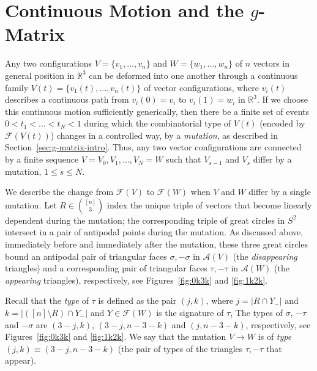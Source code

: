 \documentclass[a4paper,USenglish,cleveref, autoref, thm-restate,nolineno]{socg-lipics-v2021}
\renewcommand{\leq}{\leqslant}
\newcommand{\R}{\mathbb{R}}
\begin{document}
\section{Continuous Motion and the $g$-Matrix}
\label{sec:g-matrix}

Any two configurations $V=\{v_1,\dots,v_n\}$ and $W=\{w_1,\dots,w_n\}$ of $n$ vectors in general position in $\R^3$ can be deformed into one another through a continuous family $V(t)=\{v_1(t),\dots,v_n(t)\}$ of vector configurations, where $v_i(t)$ describes a continuous path from $v_i(0)=v_i$ to $v_i(1)=w_i$ in $\R^3$. If we choose this continuous motion sufficiently generically, then there be a finite set of events $0 < t_1 < \dots < t_N < 1$
during which the combinatorial type of $V(t)$ (encoded by $\mathcal{F}(V(t))$) changes in a controlled way, by a \emph{mutation}, as described in Section~\ref{sec:g-matrix-intro}. Thus, any two vector configurations are connected by a finite sequence $V=V_0,V_1,\dots,V_N=W$ such that $V_{s-1}$ and $V_s$ differ by a mutation, $1\leq s\leq N$. 

We describe the change from $\mathcal{F}(V)$ to $\mathcal{F}(W)$ when $V$ and $W$ differ by a single mutation. 
Let $R \in \binom{[n]}{3}$ index the unique triple of vectors that become linearly dependent during the mutation; the corresponding triple of great circles in $S^2$ intersect in a pair of antipodal points during the mutation. As discussed above, immediately before and immediately after the mutation, these three great circles bound an antipodal pair of triangular faces $\sigma,-\sigma$ in $\mathcal{A}(V)$ 
(the \emph{disappearing} triangles) and a corresponding pair of triangular faces $\tau,-\tau$ in $\mathcal{A}(W)$ (the \emph{appearing} triangles), respectively, see Figures~\ref{fig:0k3k} and \ref{fig:1k2k}. 

Recall that the \emph{type} of $\tau$ is defined as the pair $(j,k)$, where $j=|R\cap Y_-|$ and $k=|([n]\setminus R)\cap Y_-|$ and $Y\in \mathcal{F}(W)$ is the signature of $\tau$,
The types of $\sigma$, $-\tau$ and $-\sigma$ are $(3-j,k)$, $(3-j,n-3-k)$ and $(j,n-3-k)$, respectively, see Figures~\ref{fig:0k3k} and \ref{fig:1k2k}.
We say that the mutation $V\to W$ is of \emph{type~$(j,k)\equiv(3-j,n-3-k)$} (the pair of types of the triangles $\tau,-\tau$ that appear). 
\end{document}
